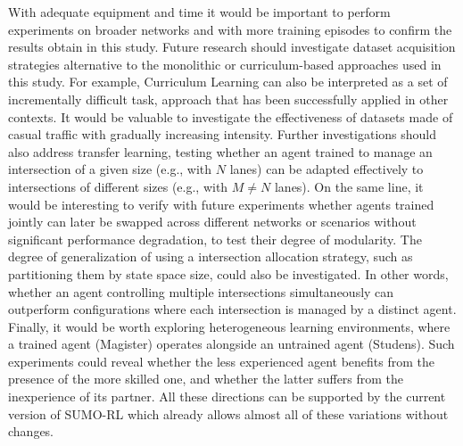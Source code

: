 With adequate equipment and time it would be important to perform experiments on broader networks and with more training episodes to confirm the results obtain in this study.
Future research should investigate dataset acquisition strategies alternative to the monolithic or curriculum-based approaches used in this study.
For example, Curriculum Learning can also be interpreted as a set of incrementally difficult task, approach that has been successfully applied in other contexts.
It would be valuable to investigate the effectiveness of datasets made of casual traffic with gradually increasing intensity.
Further investigations should also address transfer learning, testing whether an agent trained to manage an intersection of a given size (e.g., with $N$ lanes) can be adapted effectively to intersections of different sizes (e.g., with $M \ne N$ lanes).
On the same line, it would be interesting to verify with future experiments whether agents trained jointly can later be swapped across different networks or scenarios without significant performance degradation, to test their degree of modularity.
The degree of generalization of using a intersection allocation strategy, such as partitioning them by state space size, could also be investigated.
In other words, whether an agent controlling multiple intersections simultaneously can outperform configurations where each intersection is managed by a distinct agent.
Finally, it would be worth exploring heterogeneous learning environments, where a trained agent (Magister) operates alongside an untrained agent (Studens).
Such experiments could reveal whether the less experienced agent benefits from the presence of the more skilled one, and whether the latter suffers from the inexperience of its partner.
All these directions can be supported by the current version of SUMO-RL which already allows almost all of these variations without changes.
